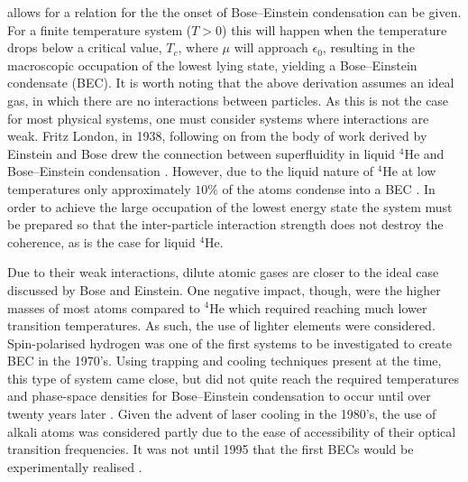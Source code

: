 allows for a relation for the the onset of Bose--Einstein condensation can be given. For a finite temperature system ($T>0$) this will happen when the temperature drops below a critical value, $T_c$, where $\mu$ will approach $\epsilon_0$, resulting in the macroscopic occupation of the lowest lying state, yielding a Bose--Einstein condensate (BEC). It is worth noting that the above derivation assumes an ideal gas, in which there are no interactions between particles. As this is not the case for most physical systems, one must consider systems where interactions are weak. Fritz London, in 1938, following on from the body of work derived by Einstein and Bose drew the connection between superfluidity in liquid $^4$He and Bose--Einstein condensation \cite[Chap.~1]{BK:Pitaevskii_Stringari_2003}. However, due to the liquid nature of $^4$He at low temperatures only approximately $10\%$ of the atoms condense into a BEC \cite{BEC:Penrose_pr_1956}. In order to achieve the large occupation of the lowest energy state the system must be prepared so that the inter-particle interaction strength does not destroy the coherence, as is the case for liquid $^4$He.

Due to their weak interactions, dilute atomic gases are closer to the ideal case discussed by Bose and Einstein. One negative impact, though, were the higher masses of most atoms compared to $^4$He which required reaching much lower transition temperatures. As such, the use of lighter elements were considered. Spin-polarised hydrogen was one of the first systems to be investigated to create BEC \cite{BEC:Kleppner_enfe_1998,BEC:Fried_prl_1998,BK:Pitaevskii_Stringari_2003} in the 1970's. Using trapping and cooling techniques present at the time, this type of system came close, but did not quite reach the required temperatures and phase-space densities for Bose--Einstein condensation to occur until over twenty years later \cite{BEC:Fried_prl_1998}. Given the advent of laser cooling in the 1980's, the use of alkali atoms was considered partly due to the ease of accessibility of their optical transition frequencies. It was not until 1995 that the first BECs would be experimentally realised \cite{BEC:Cornell_science_1995,BEC:Ketterle_prl_1995}.

